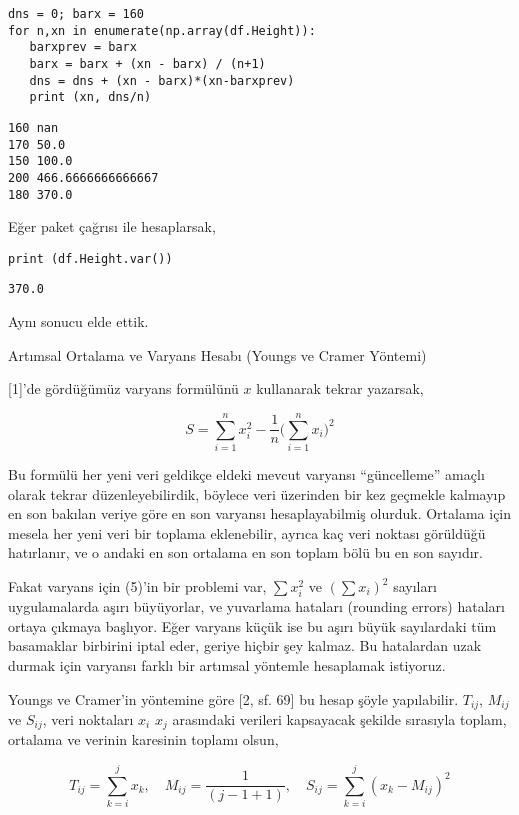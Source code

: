 \documentclass[12pt,fleqn]{article}\usepackage{../../common}
\begin{document}
\begin{verbatim}
dns = 0; barx = 160
for n,xn in enumerate(np.array(df.Height)):
   barxprev = barx
   barx = barx + (xn - barx) / (n+1)
   dns = dns + (xn - barx)*(xn-barxprev)
   print (xn, dns/n)
\end{verbatim}

\begin{verbatim}
160 nan
170 50.0
150 100.0
200 466.6666666666667
180 370.0
\end{verbatim}

Eğer paket çağrısı ile hesaplarsak, 

\begin{verbatim}
print (df.Height.var())   
\end{verbatim}

\begin{verbatim}
370.0
\end{verbatim}

Aynı sonucu elde ettik. 

Artımsal Ortalama ve Varyans Hesabı (Youngs ve Cramer Yöntemi)

[1]'de gördüğümüz varyans formülünü $x$ kullanarak tekrar yazarsak,

$$ 
S = \sum_{i=1}^{n} x_i^2 - \frac{1}{n} \bigg( \sum_{i=1}^{n} x_i \bigg)^2  
$$

Bu formülü her yeni veri geldikçe eldeki mevcut varyansı ``güncelleme''
amaçlı olarak tekrar düzenleyebilirdik, böylece veri üzerinden bir kez
geçmekle kalmayıp en son bakılan veriye göre en son varyansı
hesaplayabilmiş olurduk. Ortalama için mesela her yeni veri bir toplama
eklenebilir, ayrıca kaç veri noktası görüldüğü hatırlanır, ve o andaki en
son ortalama en son toplam bölü bu en son sayıdır. 

Fakat varyans için (5)'in bir problemi var, $\sum x_i^2$ ve $(\sum x_i)^2$
sayıları uygulamalarda aşırı büyüyorlar, ve yuvarlama hataları (rounding
errors) hataları ortaya çıkmaya başlıyor. Eğer varyans küçük ise bu aşırı
büyük sayılardaki tüm basamaklar birbirini iptal eder, geriye hiçbir şey
kalmaz. Bu hatalardan uzak durmak için varyansı farklı bir artımsal
yöntemle hesaplamak istiyoruz.

Youngs ve Cramer'in yöntemine göre [2, sf. 69] bu hesap şöyle
yapılabilir. $T_{ij}$, $M_{ij}$ ve $S_{ij}$, veri noktaları $x_i$ $x_j$
arasındaki verileri kapsayacak şekilde sırasıyla toplam, ortalama ve verinin
karesinin toplamı olsun,

$$ 
T_{ij} = \sum_{k=i}^{j} x_k , \quad  
M_{ij} = \frac{1}{(j-1+1)}, \quad
S_{ij} = \sum_{k=i}^{j} (x_k - M_{ij})^2
$$
\end{document}
